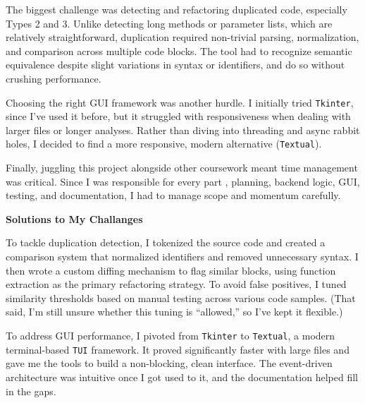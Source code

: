 \documentclass[12pt, letterpaper]{article}
\begin{document}
\quad The biggest challenge was detecting and refactoring duplicated code, especially Types 2 and 3. Unlike detecting long methods or parameter lists, which are relatively straightforward, duplication required non-trivial parsing, normalization, and comparison across multiple code blocks. The tool had to recognize semantic equivalence despite slight variations in syntax or identifiers, and do so without crushing performance.

\quad Choosing the right GUI framework was another hurdle. I initially tried \texttt{Tkinter}, since I've used it before, but it struggled with responsiveness when dealing with larger files or longer analyses. Rather than diving into threading and async rabbit holes, I decided to find a more responsive, modern alternative (\texttt{Textual}).

\quad Finally, juggling this project alongside other coursework meant time management was critical. Since I was responsible for every part , planning, backend logic, GUI, testing, and documentation, I had to manage scope and momentum carefully.

\vspace{0.5em}
\noindent\makebox[\linewidth]{\rule{\linewidth}{0.4pt}}
\vspace{-1.7em}
\begin{center}
\textbf{\large Solutions to My Challanges}
\end{center}
\vspace{-0.3em}
\noindent\makebox[\linewidth]{\rule{\linewidth}{0.4pt}}
\vspace{0.5em}

\quad To tackle duplication detection, I tokenized the source code and created a comparison system that normalized identifiers and removed unnecessary syntax. I then wrote a custom diffing mechanism to flag similar blocks, using function extraction as the primary refactoring strategy. To avoid false positives, I tuned similarity thresholds based on manual testing across various code samples. (That said, I’m still unsure whether this tuning is “allowed,” so I’ve kept it flexible.)

\quad To address GUI performance, I pivoted from \texttt{Tkinter} to \texttt{Textual}, a modern terminal-based \texttt{TUI} framework. It proved significantly faster with large files and gave me the tools to build a non-blocking, clean interface. The event-driven architecture was intuitive once I got used to it, and the documentation helped fill in the gaps.
\end{document}
